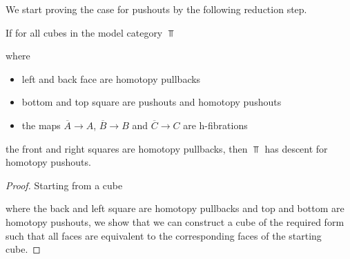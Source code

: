 We start proving the case for pushouts by the following reduction step. 
\begin{prop}\label{prop:reductionStepDescent}
    If for all cubes in the model category $\Top$
    \begin{center}
    \end{center}
    where 
    \begin{itemize}
        \item left and back face are homotopy pullbacks
        \item bottom and top square are pushouts and homotopy pushouts %
        \item the maps $\overline{A}\to A$, $\overline{B}\to B$ and $\overline{C}\to C$ are h-fibrations
    \end{itemize}
    the front and right squares are homotopy pullbacks, then $\Top$ has descent for homotopy pushouts.
    \begin{proof}
        Starting from a cube 
        \begin{center}
        \end{center}
        where the back and left square are homotopy pullbacks and top and bottom are homotopy pushouts, we show that we can construct a cube of the required form such that all faces are equivalent to the corresponding faces of the starting cube.
        

\end{proof}
\end{prop}
